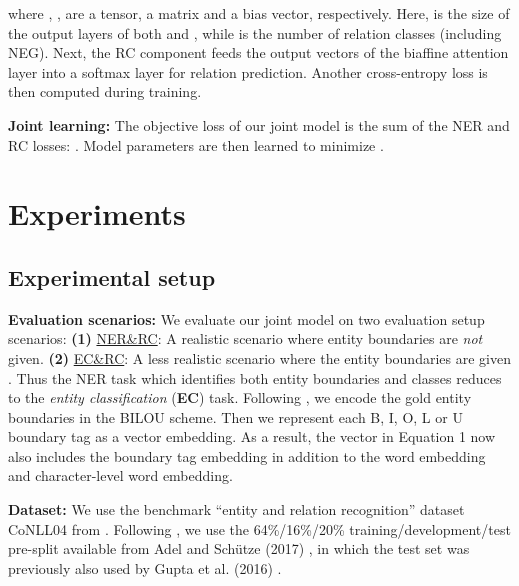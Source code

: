 \documentclass[runningheads]{llncs}
\begin{document}
\noindent   where , ,  are a  tensor, a   matrix and a bias vector, respectively. Here,  is the size of the output layers of both  and , while   is the number of relation classes (including NEG).   
Next, the RC component  feeds the output vectors  of the biaffine attention layer into a softmax layer for relation prediction. Another cross-entropy loss  is then computed during training.

\medskip

\noindent\textbf{Joint learning:} The objective loss of our joint model is the sum of the NER and RC losses:    . Model parameters are then learned to minimize .



\section{Experiments}

\subsection{Experimental setup}


\noindent\textbf{Evaluation scenarios:} We evaluate our joint model on two  evaluation setup scenarios: \textbf{(1)} \underline{NER\&RC}: A realistic  scenario where entity boundaries are \textit{not} given. \textbf{(2)} \underline{EC\&RC}: A less realistic scenario where the  entity boundaries are given \cite{RothYi07,Kate:2010,miwa-sasaki:2014:EMNLP2014}. Thus  the NER task which identifies both entity boundaries and classes reduces to the \textit{entity classification} (\textbf{EC}) task.  Following \cite{miwa-sasaki:2014:EMNLP2014}, we  encode the  gold entity boundaries  in the BILOU scheme. Then we represent each B, I, O, L or U boundary tag as  a vector embedding. As a result,  the  vector   in Equation 1 now also includes the  boundary tag embedding in addition to the word embedding and character-level word embedding.

\medskip

\noindent\textbf{Dataset:} We use the benchmark   ``entity and relation recognition'' dataset  CoNLL04 from \cite{roth-yih:2004:CONLL}. Following \cite{Bekoulis18emnlp,BEKOULIS201834}, we use the 64\%/16\%/20\% training/development/test pre-split available from Adel and Sch\"utze (2017) \cite{adel-schutze:2017:EMNLP2017}, in which the test set was previously also used by Gupta et al. (2016) \cite{gupta-schutze-andrassy:2016:COLING}. 

\medskip
\end{document}
